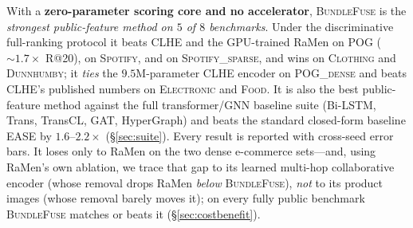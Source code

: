 With a \textbf{zero-parameter scoring core and no accelerator}, \textsc{BundleFuse} is the \emph{strongest
public-feature method on $5$ of $8$ benchmarks}. Under the discriminative full-ranking protocol it beats CLHE and the
GPU-trained RaMen on \textsc{POG} (${\sim}1.7\times$ R@20), on \textsc{Spotify}, and on \textsc{Spotify\_sparse}, and
wins on \textsc{Clothing} and \textsc{Dunnhumby}; it \emph{ties} the $9.5$M-parameter CLHE encoder on
\textsc{POG\_dense} and beats CLHE's published numbers on \textsc{Electronic} and \textsc{Food}. It is also the best
public-feature method against the full transformer/GNN baseline suite (Bi-LSTM, Trans, TransCL, GAT, HyperGraph) and
beats the standard closed-form baseline EASE by $1.6$--$2.2\times$ (\S\ref{sec:suite}). Every result is
reported with cross-seed error bars. It loses only to RaMen on the two dense e-commerce sets---and, using RaMen's own
ablation, we trace that gap to its learned multi-hop collaborative encoder (whose removal drops RaMen \emph{below}
\textsc{BundleFuse}), \emph{not} to its product images (whose removal barely moves it); on every fully public
benchmark \textsc{BundleFuse} matches or beats it (\S\ref{sec:costbenefit}).

